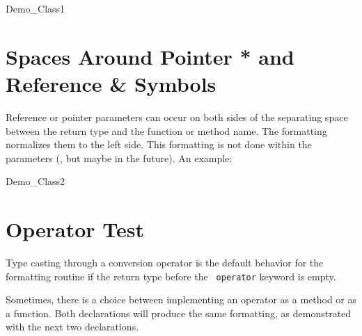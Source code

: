 \documentclass[12pt]{article}
\begin{document}
{\begin{ccClass}{Demo_Class1}
\end{ccClass}

\section{Spaces Around Pointer * and Reference \& Symbols}

Reference or pointer parameters can occur on both sides of the
separating space between the return type and the function or method
name. The formatting normalizes them to the left side. This
formatting is not done within the\footnotemark{} parameters (, but maybe in the
future). An example: 

%


    \ccGlue
    \ccGlue
    \ccGlue

\begin{ccClass}{Demo_Class2}
\section{Operator Test}

Type casting through a conversion operator is the default behavior 
for the formatting routine if the return type before the {\tt 
operator} keyword is empty.

    \ccGlue

Sometimes, there is a choice between
implementing an operator as a method or as a function. Both
declarations will produce the same formatting, as demonstrated
with the next two declarations.


    \ccGlue


\end{ccClass}}
\end{document}
